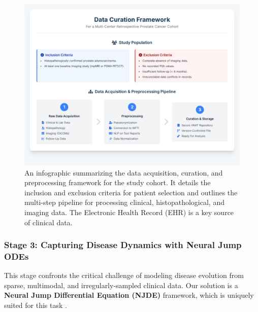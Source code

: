 \documentclass[11pt, a4paper]{article}
\begin{document}
\begin{figure}[H]
    \centering
    \includegraphics[width=\textwidth]{dc.png}
    \caption{An infographic summarizing the data acquisition, curation, and preprocessing framework for the study cohort. It details the inclusion and exclusion criteria for patient selection and outlines the multi-step pipeline for processing clinical, histopathological, and imaging data. The Electronic Health Record (EHR) is a key source of clinical data.}
    \label{fig:data_curation}
\end{figure}

\subsubsection{Stage 3: Capturing Disease Dynamics with Neural Jump ODEs}
This stage confronts the critical challenge of modeling disease evolution from sparse, multimodal, and irregularly-sampled clinical data. Our solution is a \textbf{Neural Jump Differential Equation (NJDE)} framework, which is uniquely suited for this task \cite{GwakSim2020}.
\end{document}
